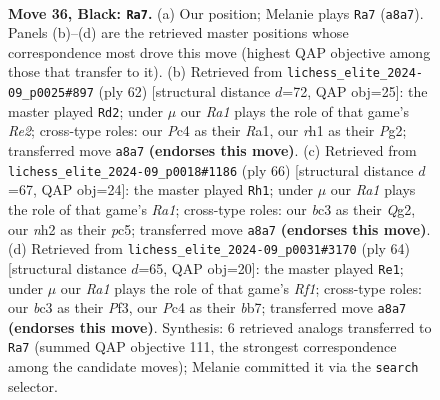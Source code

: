 \documentclass[11pt]{article}
\begin{document}
\clearpage

\begin{figure}[p]\centering
\begin{subfigure}{0.46\textwidth}\centering
\resizebox{\linewidth}{!}{%
\newchessgame
\chessboard[
  setfen={rk6/1p2b1pr/p1p1b2p/P4p2/2pP3P/2B1P1P1/1P3P1N/R1K4R b - - 0 36},
  showmover=false,
  pgfstyle=straightmove, color=movearrow, markmove={a8-a7}
]}
\caption{}
\end{subfigure}\hfill
\begin{subfigure}{0.46\textwidth}\centering
\resizebox{\linewidth}{!}{%
\newchessgame
\chessboard[
  setfen={3r2k1/5pp1/p3r2p/P2pp3/1Np5/1bP1PP1P/1P2RKP1/R7 w - - 10 32},
  showmover=false,
  pgfstyle=straightmove, color=movearrow, markmove={e2-d2}
]}
\caption{}
\end{subfigure}
\\[4pt]
\begin{subfigure}{0.46\textwidth}\centering
\resizebox{\linewidth}{!}{%
\newchessgame
\chessboard[
  setfen={3rk3/2p3p1/1p1b2P1/p1p1pP2/P1P2p1r/3P4/1BP1KPQ1/R7 w - - 0 34},
  showmover=false,
  pgfstyle=straightmove, color=movearrow, markmove={a1-h1}
]}
\caption{}
\end{subfigure}\hfill
\begin{subfigure}{0.46\textwidth}\centering
\resizebox{\linewidth}{!}{%
\newchessgame
\chessboard[
  setfen={3r1k2/1b2r3/p5p1/P3pp1p/2Bp4/3P1P1P/1PPR2P1/5RK1 w - - 0 33},
  showmover=false,
  pgfstyle=straightmove, color=movearrow, markmove={f1-e1}
]}
\caption{}
\end{subfigure}
\caption{\textbf{Move 36, Black: \texttt{Ra7}.} (a) Our position; Melanie plays \texttt{Ra7} (\texttt{a8a7}). Panels (b)--(d) are the retrieved master positions whose correspondence most drove this move (highest QAP objective among those that transfer to it). (b) Retrieved from \texttt{lichess\_elite\_2024-09\_p0025\#897} (ply 62) [structural distance $d$=72, QAP obj=25]: the master played \texttt{Rd2}; under $\mu$ our \emph{Ra1} plays the role of that game's \emph{Re2}; cross-type roles: our \emph{P}c4 as their \emph{R}a1, our \emph{r}h1 as their \emph{P}g2; transferred move \texttt{a8a7} \textbf{(endorses this move)}. (c) Retrieved from \texttt{lichess\_elite\_2024-09\_p0018\#1186} (ply 66) [structural distance $d$=67, QAP obj=24]: the master played \texttt{Rh1}; under $\mu$ our \emph{Ra1} plays the role of that game's \emph{Ra1}; cross-type roles: our \emph{b}c3 as their \emph{Q}g2, our \emph{n}h2 as their \emph{p}c5; transferred move \texttt{a8a7} \textbf{(endorses this move)}. (d) Retrieved from \texttt{lichess\_elite\_2024-09\_p0031\#3170} (ply 64) [structural distance $d$=65, QAP obj=20]: the master played \texttt{Re1}; under $\mu$ our \emph{Ra1} plays the role of that game's \emph{Rf1}; cross-type roles: our \emph{b}c3 as their \emph{P}f3, our \emph{P}c4 as their \emph{b}b7; transferred move \texttt{a8a7} \textbf{(endorses this move)}. Synthesis: 6 retrieved analogs transferred to \texttt{Ra7} (summed QAP objective 111, the strongest correspondence among the candidate moves); Melanie committed it via the \texttt{search} selector.}
\label{fig:thought-m71}
\end{figure}
\end{document}
